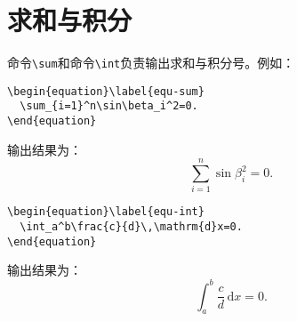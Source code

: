 \section{求和与积分}\label{section4-4}
命令\verb|\sum|和命令\verb|\int|负责输出求和与积分号。例如：
\begin{verbatim}
\begin{equation}\label{equ-sum}
  \sum_{i=1}^n\sin\beta_i^2=0.
\end{equation}
\end{verbatim}
输出结果为：
\begin{equation}\label{equ-sum}
\sum_{i=1}^n\sin\beta_i^2=0.
\end{equation}
\begin{verbatim}
\begin{equation}\label{equ-int}
  \int_a^b\frac{c}{d}\,\mathrm{d}x=0.
\end{equation}
\end{verbatim}
输出结果为：
\begin{equation}\label{equ-int}
  \int_a^b\frac{c}{d}\,\mathrm{d}x=0.
\end{equation}


